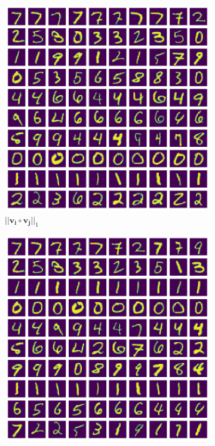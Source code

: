 \documentclass[10pt,a4paper, nocenter]{report}
\begin{document}
\begin{enumerate}
        \begin{figure}[h]
            \begin{center}
                \begin{subfigure}[b]{0.3\textwidth}
                    \centering
                    \includegraphics[width=\textwidth]{../../images/number_clustering_10_0norm.png}
                    \caption{$\lvert \lvert \mathbf{v_i} \circ \mathbf{v_j} \rvert \rvert_1$ \vspace{10pt} }
                    \label{fig:clustering_10_0norm}
                \end{subfigure}           
                \begin{subfigure}[b]{0.3\textwidth}
                    \centering
                    \includegraphics[width=\textwidth]{../../images/number_clustering_10_2norm.png}

\end{subfigure}
\end{center}
\end{figure}
\end{enumerate}
\end{document}
